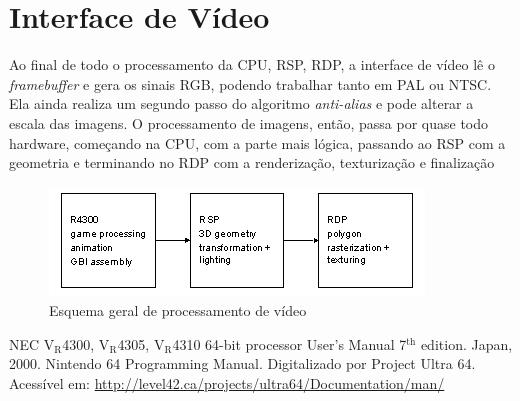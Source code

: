 \documentclass[12pt]{article}
\newcommand{\lowtext}[1]{$_{\text{#1}}$}
\begin{document}
\section{Interface de Vídeo}
Ao final de todo o processamento da CPU, RSP, RDP, a interface de vídeo lê o \textit{framebuffer} e gera os sinais RGB, podendo trabalhar tanto em PAL ou NTSC. Ela ainda realiza um segundo passo do algoritmo \textit{anti-alias} e pode alterar a escala das imagens.
O processamento de imagens, então, passa por quase todo hardware, começando na CPU, com a parte mais lógica, passando ao RSP com a geometria e terminando no RDP com a renderização, texturização e finalização

\begin{figure}[H]
    \centering
        \includegraphics{figures/Video_pipeline}
    \caption{Esquema geral de processamento de vídeo}
\end{figure}


\pagebreak
\begin{thebibliography}{1}
NEC V\lowtext{R}4300, V\lowtext{R}4305, V\lowtext{R}4310 64-bit 
processor User's Manual 7$^{\text{th}}$ edition. Japan, 2000.
Nintendo 64 Programming Manual. Digitalizado por Project Ultra 64. Acessível em: \url{http://level42.ca/projects/ultra64/Documentation/man/}
\end{thebibliography}
\end{document}
